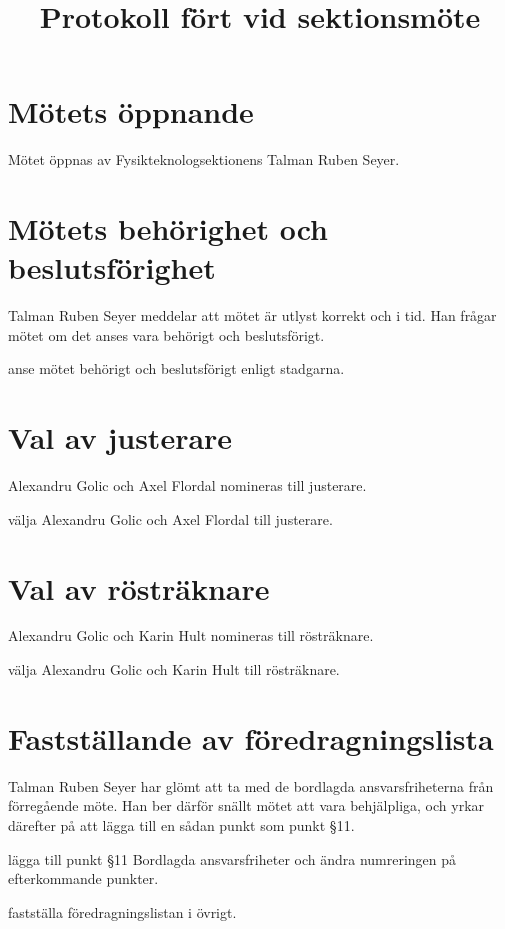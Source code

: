 \documentclass[hidelinks]{sektionsmote} %
\title{Protokoll fört vid sektionsmöte}
\begin{document}
\maketitle

\section{Mötets öppnande}
Mötet öppnas \tid av Fysikteknologsektionens Talman Ruben Seyer.


\section{Mötets behörighet och beslutsförighet}
Talman Ruben Seyer meddelar att mötet är utlyst korrekt och i tid.
Han frågar mötet om det anses vara behörigt och beslutsförigt.
\begin{beslut}
    \item anse mötet behörigt och beslutsförigt enligt stadgarna.
\end{beslut}


\section{Val av justerare}
Alexandru Golic och Axel Flordal nomineras till justerare.
\begin{beslut}
  \item välja Alexandru Golic och Axel Flordal till justerare.
\end{beslut}


\section{Val av rösträknare}
Alexandru Golic och Karin Hult nomineras till rösträknare.
\begin{beslut}
  \item välja Alexandru Golic och Karin Hult till rösträknare.
\end{beslut}


\section{Fastställande av föredragningslista}
Talman Ruben Seyer har glömt att ta med de bordlagda ansvarsfriheterna från förregående möte.
Han ber därför snällt mötet att vara behjälpliga, och yrkar därefter på att lägga till en sådan punkt som punkt §11.
\begin{beslut}
  \item lägga till punkt §11 Bordlagda ansvarsfriheter och ändra numreringen på efterkommande punkter.
  \item fastställa föredragningslistan i övrigt.
\end{beslut}
\end{document}
